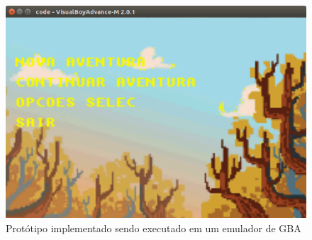 \begin{figure}[H]
 \centering \includegraphics[keepaspectratio=true,scale=0.6]{figuras/tw-gba-1.eps}
   \caption{Protótipo implementado sendo executado em um emulador de GBA}
   \label{tw-gba-1}
\end{figure}